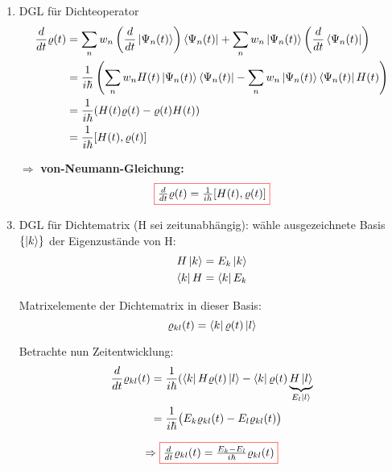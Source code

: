 \begin{enumerate}
\item DGL für Dichteoperator
\begin{align}
    \frac{d}{dt} \varrho (t) &= \sum_n w_n \left(\frac{d}{dt} \ket{\Psi_n(t)} \right) \bra{\Psi_n(t)} + \sum_n w_n \ket{\Psi_n(t)} \left(\frac{d}{dt} \bra{\Psi_n(t)} \right)\\
    &= \frac{1}{i \hbar} \left(\sum_n w_n H(t) \ket{\Psi_n(t)}\bra{\Psi_n(t)} - \sum_n w_n \ket{\Psi_n(t)}\bra{\Psi_n(t)} H(t) \right) \\
    &= \frac{1}{i \hbar} ( H(t) \varrho(t) - \varrho(t) H(t)) \\
    &= \frac{1}{i \hbar} [H(t), \varrho(t)] 
\end{align}

\vspace{0.5cm}
\item[$\Rightarrow$] \textbf{von-Neumann-Gleichung:}
\begin{equation}\label{Neumann}
    \fcolorbox{red}{white}{$\frac{d}{dt} \varrho (t) = \frac{1}{ih} [H(t), \varrho(t)]$}
\end{equation}
\vspace{0.5cm}

\item DGL für Dichtematrix (H sei zeitunabhängig): wähle ausgezeichnete Basis $\{\ket{k}\}$ der Eigenzustände von H:
\begin{align}
    H \ket{k} &= E_k \ket{k} \\
    \bra{k} H &= \bra{k} E_k
\end{align}

Matrixelemente der Dichtematrix in dieser Basis:
\begin{equation}
    \varrho_{kl}(t) = \bra{k} \varrho(t) \ket{l}
\end{equation}

Betrachte nun Zeitentwicklung:
\begin{align}
    \frac{d}{dt} \varrho_{kl}(t) &= \frac{1}{i \hbar}(\bra{k}H \varrho(t) \ket{l} - \bra{k} \varrho(t) \underbrace{H \ket{l}}_{E_l \ket{l}} \\
    &= \frac{1}{i \hbar} \bigl(E_k \varrho_{kl}(t) - E_l \varrho_{kl}(t) \bigr)
\end{align}

\begin{equation}   
    \Rightarrow \fcolorbox{red}{white}{$\frac{d}{dt} \varrho_{kl}(t) = \frac{E_k-E_l}{i \hbar} \varrho_{kl}(t)$}
\end{equation}


\end{enumerate}

